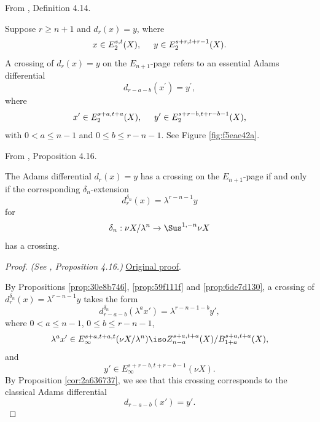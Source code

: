\begin{definition}
\label{paper:4.14}
From \cite{LWX126}, Definition 4.14.\par

\label{def:classicalcrossdiff}
    Suppose $r\ge n+1$ and $d_r(x)=y$, where
    $$x\in E_2^{s,t}(X), \hspace{0.5cm} y\in E_2^{s+r,t+r-1}(X).$$
    A crossing of $d_r(x)=y$ on the $E_{n+1}$-page refers to an essential Adams differential
    $$d_{r-a-b}(x^\prime)=y^\prime,$$
    where
    $$x^\prime\in E_2^{s+a,t+a}(X), \hspace{.5cm} y^\prime\in E_2^{s+r-b,t+r-b-1}(X),$$
    with $0<a\le n-1$ and $0\le b\le r-n-1$. See Figure \ref{fig:f5eae42a}.



\end{definition}

\begin{proposition}
\label{paper:4.16}
From \cite{LWX126}, Proposition 4.16.\par

\label{prop:cross-dr-En}
    The Adams differential $d_r(x)=y$ has a crossing on the $E_{n+1}$-page if and only if the corresponding $\delta_n$-extension
    $$d^{\delta_n}_r(x)=\lambda^{r-n-1}y$$
    for
    $$\delta_{n}:\nu X/\lambda^{n}\to \Sus^{1,-n}\nu X$$
    has a crossing.



\end{proposition}
\begin{proof}
\textit{(See \cite{LWX126}, Proposition 4.16.)} \href{paper/main.tex.html#L1225}{Original proof}.

By Propositions \ref{prop:30e8b746}, \ref{prop:59f111f} and \ref{prop:6de7d130}, a crossing of $d^{\delta_n}_r(x)=\lambda^{r-n-1}y$ takes the form
    $$d^{\delta_n}_{r-a-b}(\lambda^a x')=\lambda^{r-n-1-b}y',$$
    where $0<a\le n-1$, $0\le b\le r-n-1$,
    $$\lambda^a x'\in E_\infty^{s+a,t+a,t}(\nu X/\lambda^n)\iso Z_{n-a}^{s+a,t+a}(X)/B_{1+a}^{s+a,t+a}(X),$$
    and
    $$y'\in E_\infty^{s+r-b, t+r-b-1}(\nu X).$$
    By Proposition \ref{cor:2a636737}, we see that this crossing corresponds to the classical Adams differential
    $$d_{r-a-b}(x')=y'.$$
\end{proof}


